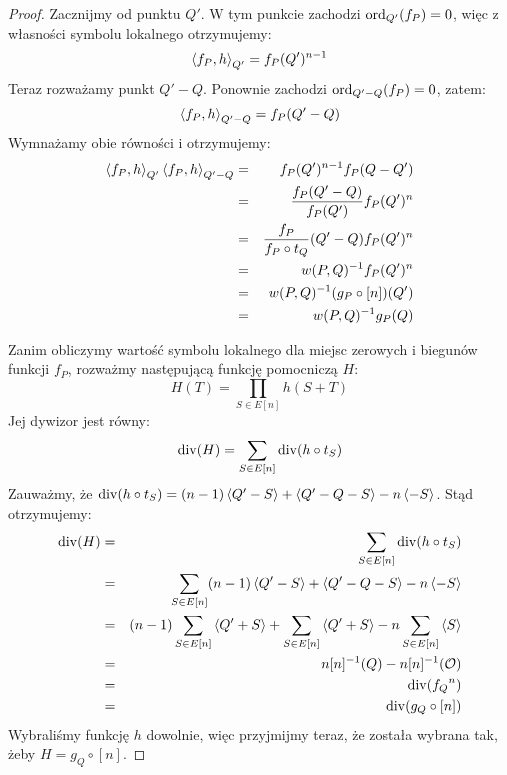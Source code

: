 \begin{proof}
Zacznijmy od punktu $Q'$. W tym punkcie zachodzi $\operatorname{ord}_{Q'}(f_P) = 0$,
więc z własności symbolu lokalnego otrzymujemy:
\begin{equation*}
\left\langle f_P , h \right\rangle_{Q'} = f_P(Q')^{n-1}
\end{equation*}
Teraz rozważamy punkt $Q' - Q$. Ponownie zachodzi $\operatorname{ord}_{Q' - Q}(f_P) = 0$,
zatem:
\begin{equation*}
\left\langle f_P , h \right\rangle_{Q' - Q} = f_P(Q' - Q)
\end{equation*}
Wymnażamy obie równości i otrzymujemy:
\begin{eqnarray*}
\left\langle f_P , h \right\rangle_{Q'}\left\langle f_P , h \right\rangle_{Q' - Q}
& = & f_P(Q')^{n-1} f_P(Q - Q') \\
& = & \frac{f_P(Q' - Q)}{f_P(Q')} f_P(Q')^n \\
& = & \frac{f_P}{f_P \circ t_Q}(Q' - Q) f_P(Q')^n \\
& = & w(P,Q)^{-1} f_P(Q')^n \\
& = & w(P,Q)^{-1} (g_P \circ [n])(Q') \\
& = & w(P,Q)^{-1} g_P(Q)
\end{eqnarray*}

Zanim obliczymy wartość symbolu lokalnego
dla miejsc zerowych i biegunów funkcji $f_P$,
rozważmy następującą funkcję pomocniczą $H$:
\begin{equation*}
H(T) = \prod_{S \in E[n]} h(S + T)
\end{equation*}
Jej dywizor jest równy:
\begin{equation*}
\operatorname{div}(H) = \sum_{S \in E[n]} \operatorname{div}(h \circ t_S)
\end{equation*}
Zauważmy, że
$\operatorname{div}(h \circ t_S) = (n-1)\left\langle Q' - S\right\rangle + \left\langle Q' - Q - S\right\rangle - n\left\langle-S\right\rangle$.
Stąd otrzymujemy:
\begin{eqnarray*}
\operatorname{div}(H)
& = & \sum_{S \in E[n]} \operatorname{div}(h \circ t_S) \\
& = & \sum_{S \in E[n]} (n-1)\left\langle Q' - S\right\rangle + \left\langle Q' - Q - S\right\rangle - n\left\langle-S\right\rangle \\
& = & (n-1)\sum_{S \in E[n]}\left\langle Q' + S\right\rangle +
      \sum_{S \in E[n]}\left\langle Q' + S\right\rangle -
      n\sum_{S \in E[n]}\left\langle S\right\rangle \\
& = & n[n]^{-1}(Q) - n[n]^{-1}(\mathcal{O}) \\
& = & \operatorname{div}({f_Q}^n) \\
& = & \operatorname{div}(g_Q \circ [n])
\end{eqnarray*}
Wybraliśmy funkcję $h$ dowolnie, więc przyjmijmy teraz,
że została wybrana tak, żeby $H = g_Q \circ [n]$.


\end{proof}

